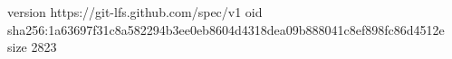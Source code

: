 version https://git-lfs.github.com/spec/v1
oid sha256:1a63697f31c8a582294b3ee0eb8604d4318dea09b888041c8ef898fc86d4512e
size 2823
